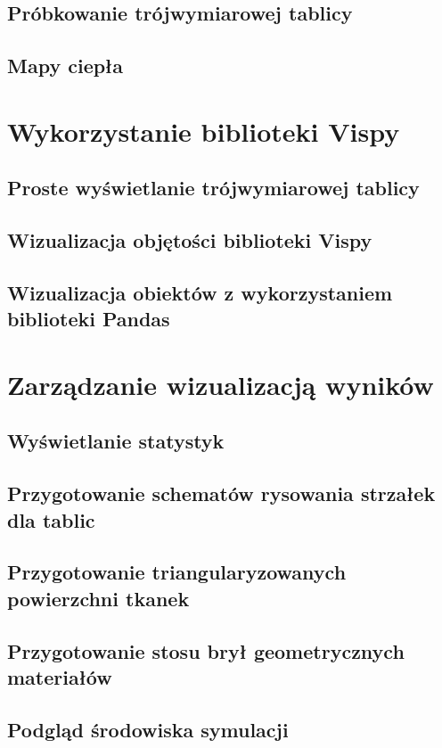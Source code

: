 \subsection{Próbkowanie trójwymiarowej tablicy}
\subsection{Mapy ciepła}

\section{Wykorzystanie biblioteki Vispy}
\subsection{Proste wyświetlanie trójwymiarowej tablicy}
\subsection{Wizualizacja objętości biblioteki Vispy}
\subsection{Wizualizacja obiektów z wykorzystaniem biblioteki Pandas}

\section{Zarządzanie wizualizacją wyników}
\subsection{Wyświetlanie statystyk}
\subsection{Przygotowanie schematów rysowania strzałek dla tablic}
\subsection{Przygotowanie triangularyzowanych powierzchni tkanek}
\subsection{Przygotowanie stosu brył geometrycznych materiałów}
\subsection{Podgląd środowiska symulacji}
